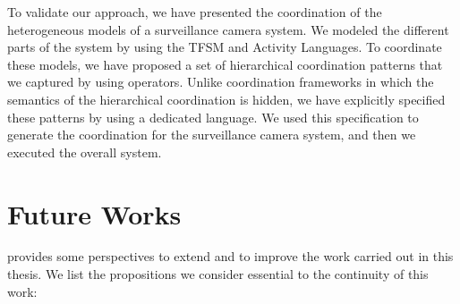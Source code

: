 To validate our approach, we have presented the coordination of the heterogeneous models of a surveillance camera system. We modeled the different parts of the system by using the TFSM and Activity Languages. To coordinate these models, we have proposed a set of hierarchical coordination patterns that we captured by using \bcool operators. Unlike coordination frameworks in which the semantics of the hierarchical coordination is hidden, we have explicitly specified these patterns by using a dedicated language. We used this specification to generate the coordination for the surveillance camera system, and then we executed the overall system.


	  
\section{Future Works}
\bcool provides some perspectives to extend and to improve the work carried out in this thesis. We list the propositions we consider essential to the continuity of this work:

